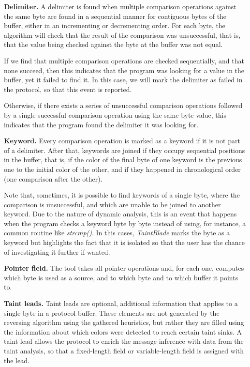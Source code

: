 \documentclass[conference]{IEEEtran}
\begin{document}
\textbf{Delimiter.} A delimiter is found when multiple comparison operations against the same byte
are found in a sequential manner for contiguous bytes of the buffer, either in an incrementing
or decrementing order. For each byte, the algorithm will check that the result of the comparison
was unsuccessful, that is, that the value being checked against the byte at the buffer was not equal.

If we find that multiple comparison operations are checked sequentially, and
that none succeed, then this indicates that the program was looking for a value
in the buffer, yet it failed to find it. In this case, we will mark the
delimiter as failed in the protocol, so that this event is reported.

Otherwise, if there exists a series of unsuccessful comparison operations
followed by a single successful comparison operation using the same byte value,
this indicates that the program found the delimiter it was looking for.

\textbf{Keyword.} Every comparison operation is marked as a keyword if it is not part of a delimiter. After that,
keywords are joined if they occupy sequential positions in the buffer, that is, if the color of the final byte of
one keyword is the previous one to the initial color of the other, and if they happened in chronological order
(one comparison after the other).

Note that, sometimes, it is possible to find keywords of a single byte, where
the comparison is unsuccessful, and which are unable to be joined to another
keyword. Due to the nature of dynamic analysis, this is an event that happens
when the program checks a keyword byte by byte instead of using, for instance,
a common routine like \textit{strcmp()}. In this cases, \textit{TaintBlade}
marks the byte as a keyword but highlights the fact that it is isolated so that
the user has the chance of investigating it further if wanted.

\textbf{Pointer field.} The tool takes all pointer operations and, for each one, computes which byte is used as a source,
and to which byte and to which buffer it points to.

\textbf{Taint leads.} Taint leads are optional, additional information that applies to a single byte in a protocol buffer.
These elements are not generated by the reversing algorithm using the gathered heuristics, but rather
they are filled using the information about which colors were detected to reach certain taint sinks.
A taint lead allows the protocol to enrich the message inference with data from the taint analysis,
so that a fixed-length field or variable-length field is assigned with the lead.
\end{document}
